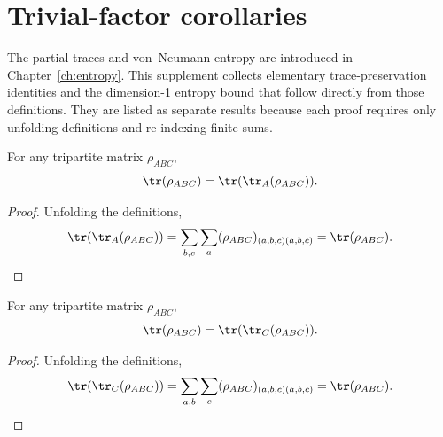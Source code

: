 
\section{Trivial-factor corollaries}

The partial traces and von~Neumann entropy are introduced in
Chapter~\ref{ch:entropy}.  This supplement collects elementary
trace-preservation identities and the dimension-1 entropy bound that
follow directly from those definitions.  They are listed as separate
results because each proof requires only unfolding definitions and
re-indexing finite sums.



\begin{theorem}
    \label{thm:trace_tracea_abc}
    \leanok
    For any tripartite matrix $\rho_{ABC}$,
    \[
        \tr(\rho_{ABC}) = \tr(\tr_A(\rho_{ABC})).
    \]
\end{theorem}

\begin{proof}\leanok
    Unfolding the definitions,
    \[
        \tr(\tr_A(\rho_{ABC}))
        = \sum_{b,c} \sum_{a}
        (\rho_{ABC})_{(a,b,c)(a,b,c)}
        = \tr(\rho_{ABC}).
    \]
\end{proof}


\begin{theorem}
    \label{thm:trace_tracec_abc}
    \leanok
    For any tripartite matrix $\rho_{ABC}$,
    \[
        \tr(\rho_{ABC}) = \tr(\tr_C(\rho_{ABC})).
    \]
\end{theorem}

\begin{proof}\leanok
    Unfolding the definitions,
    \[
        \tr(\tr_C(\rho_{ABC}))
        = \sum_{a,b} \sum_{c}
        (\rho_{ABC})_{(a,b,c)(a,b,c)}
        = \tr(\rho_{ABC}).
    \]
\end{proof}


